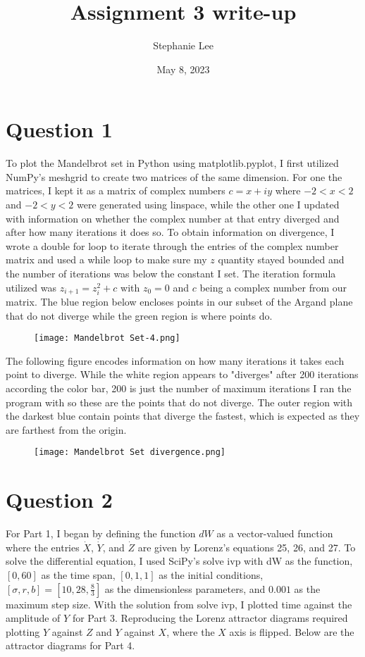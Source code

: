 \documentclass{article}
\title{Assignment 3 write-up}
\author{Stephanie Lee}
\date{May 8, 2023}
\begin{document}
\maketitle

\section{Question 1}

To plot the Mandelbrot set in Python using matplotlib.pyplot, I first utilized NumPy's meshgrid to create two matrices of the same dimension. For one the matrices, I kept it as a matrix of complex numbers $c=x+iy$ where $-2<x<2$ and $-2<y<2$ were generated using linspace, while the other one I updated with information on whether the complex number at that entry diverged and after how many iterations it does so. To obtain information on divergence, I wrote a double for loop to iterate through the entries of the complex number matrix and used a while loop to make sure my $z$ quantity stayed bounded and the number of iterations was below the constant I set. The iteration formula utilized was $z_{i+1}=z_{i}^2+c$ with $z_0=0$ and $c$ being a complex number from our matrix. The blue region below encloses points in our subset of the Argand plane that do not diverge while the green region is where points do. 

\begin{figure}[h]
\graphicspath{ {./} }
\centering
\texttt{[image: Mandelbrot Set-4.png]}
\end{figure}

The following figure encodes information on how many iterations it takes each point to diverge. While the white region appears to "diverges" after 200 iterations according the color bar, 200 is just the number of maximum iterations I ran the program with so these are the points that do not diverge. The outer region with the darkest blue contain points that diverge the fastest, which is expected as they are farthest from the origin.

\begin{figure}[h]
\graphicspath{ {./} }
\centering
\texttt{[image: Mandelbrot Set divergence.png]}
\end{figure}

\section{Question 2}

For Part 1, I began by defining the function $dW$ as a vector-valued function where the entries $\dot X$, $\dot Y$, and $\dot Z$ are given by Lorenz's equations 25, 26, and 27. To solve the differential equation, I used SciPy's solve ivp with dW as the function, $[0, 60]$ as the time span, $[0, 1, 1]$ as the initial conditions, $[\sigma, r, b]= [10, 28, \frac{8}{3}]$ as the dimensionless parameters, and $0.001$ as the maximum step size. With the solution from solve ivp, I plotted time against the amplitude of $Y$ for Part 3. Reproducing the Lorenz attractor diagrams required plotting $Y$ against $Z$ and $Y$ against $X$, where the $X$ axis is flipped. Below are the attractor diagrams for Part 4. 
\end{document}

